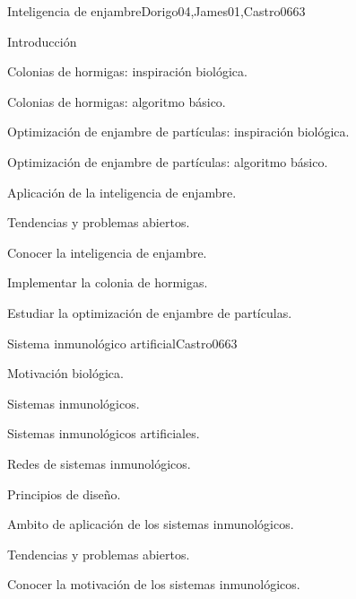\begin{syllabus}
\begin{unit}{Inteligencia de enjambre}{Dorigo04,James01,Castro06}{6}{3}
\begin{topics}
        \item Introducción
        \item Colonias de hormigas: inspiración biológica.
        \item Colonias de hormigas: algoritmo básico.
        \item Optimización de enjambre de partículas: inspiración biológica.
        \item Optimización de enjambre de partículas: algoritmo básico.
        \item Aplicación de la inteligencia de enjambre.
        \item Tendencias y problemas abiertos.
    \end{topics}
    \begin{unitgoals}
        \item Conocer la inteligencia de enjambre.
        \item Implementar la colonia de hormigas.
        \item Estudiar la optimización de enjambre de partículas.
    \end{unitgoals}
\end{unit}

\begin{unit}{Sistema inmunológico artificial}{Castro06}{6}{3}
\begin{topics}
        \item Motivación biológica.
        \item Sistemas inmunológicos.
        \item Sistemas inmunológicos artificiales.
        \item Redes de sistemas inmunológicos.
        \item Principios de diseño.
        \item Ambito de aplicación de los sistemas inmunológicos.
        \item Tendencias y problemas abiertos.
    \end{topics}
    \begin{unitgoals}
        \item Conocer la motivación de los sistemas inmunológicos.
    \end{unitgoals}
\end{unit}


\end{syllabus}

